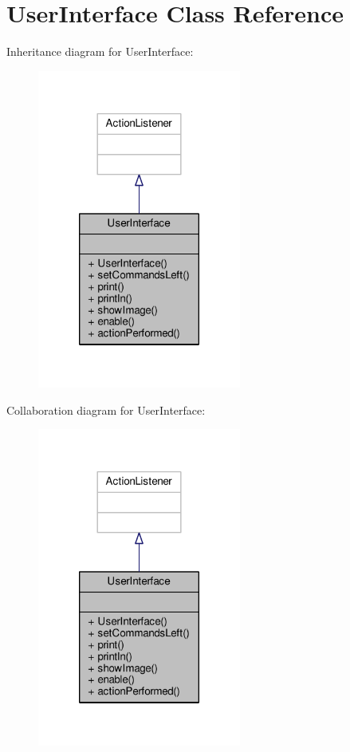 \hypertarget{classUserInterface}{\section{User\-Interface Class Reference}
\label{classUserInterface}
}


Inheritance diagram for User\-Interface\-:\nopagebreak
\begin{figure}[H]
\begin{center}
\leavevmode
\includegraphics[width=190pt]{classUserInterface__inherit__graph}
\end{center}
\end{figure}


Collaboration diagram for User\-Interface\-:\nopagebreak
\begin{figure}[H]
\begin{center}
\leavevmode
\includegraphics[width=190pt]{classUserInterface__coll__graph}
\end{center}
\end{figure}
